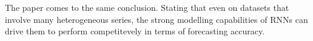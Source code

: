 The paper \cite{Hewamalage2021} comes to the same conclusion. Stating that 
even on datasets that involve many heterogeneous series, the strong modelling capabilities of RNNs can drive
them to perform competitevely in terms of forecasting accuracy.


%
